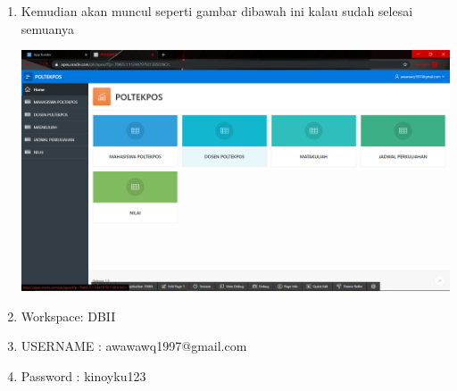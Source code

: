 \begin{enumerate}
     \item Kemudian akan muncul seperti gambar dibawah ini kalau sudah selesai semuanya
	\begin{center}
    \includegraphics[scale=0.2]{Apex/76.png}
    \end{center}
    
    \item Workspace: DBII
    \item USERNAME : awawawq1997@gmail.com
    \item Password : kinoyku123
    
     
     

\end{enumerate}
